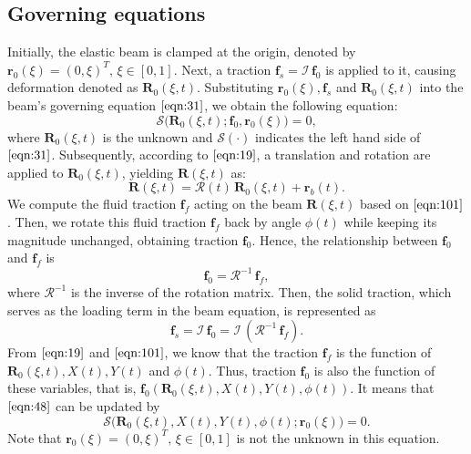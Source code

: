 \documentclass[lineno]{JFM-FLM_Au}
\begin{document}
\subsection{Governing equations}
Initially, the elastic beam is clamped at the origin, denoted by $\mathbf{r}_0(\xi)=(0,\xi)^T,\,\xi\in [0,1]$. Next, a traction $\mathbf{f}_s=\mathcal{I}\,\mathbf{f}_0$  is applied to it, causing deformation denoted as $\mathbf{R}_0(\xi,t)$. Substituting 
$\mathbf{r}_0(\xi), \mathbf{f}_s$ and $\mathbf{R}_0(\xi,t)$ into the beam's governing equation $\eqref{eqn:31}$, we obtain the following equation:
\begin{equation}
	\label{eqn:48}
	\mathbf{\mathcal{S}}\Big(\mathbf{R}_0(\xi,t);\mathbf{f}_0,\mathbf{r}_0(\xi)\Big)=0,
\end{equation}
where $\mathbf{R}_0(\xi,t)$ is the unknown and $\mathbf{\mathcal{S}}(\cdot)$ indicates the left hand side of $\eqref{eqn:31}$.
Subsequently, according to $\eqref{eqn:19}$, a translation and rotation are applied to 
$\mathbf{R}_0(\xi,t)$, yielding $\mathbf{R}(\xi,t)$ as:
\begin{equation}
	\label{eqn:49}
	\mathbf{R}(\xi,t)=\mathbf{\mathcal{R}}(t)\,\mathbf{R}_0(\xi,t)+\mathbf{r}_b(t).
\end{equation}
We compute the fluid traction $\mathbf{f}_f$ acting on the beam $\mathbf{R}(\xi,t)$ based on $\eqref{eqn:101}$. Then, we rotate this fluid traction $\mathbf{f}_f$ back by angle $\phi(t)$ while keeping its magnitude unchanged, obtaining traction $\mathbf{f}_0$. Hence, the relationship between $\mathbf{f}_0$ and $\mathbf{f}_f$ is 
\begin{equation}
	\label{eqn:50}
	\mathbf{f}_0=\mathbf{\mathcal{R}}^{-1}\,\mathbf{f}_f,
\end{equation}
where $\mathbf{\mathcal{R}}^{-1}$ is the inverse of the rotation matrix. Then, the solid traction, which serves as the loading term in the beam equation, is represented as 
\begin{equation}
	\label{eqn:67}
	\mathbf{f}_s=\mathcal{I}\,\mathbf{f}_0=\mathcal{I}\,\left(\mathbf{\mathcal{R}}^{-1}\,\mathbf{f}_f\right).
\end{equation}
From $\eqref{eqn:19}$ and $\eqref{eqn:101}$, we know that the traction $\textbf{f}_f$ is the function of $\textbf{R}_0(\xi,t), X(t), Y(t)$ and $\phi(t)$. Thus, traction $\textbf{f}_0$ is also the function of these variables, that is, $\textbf{f}_0\left(\textbf{R}_0(\xi,t), X(t), Y(t),\phi(t)\right)$. It means that $\eqref{eqn:48}$ can be updated by
\begin{equation}
	\label{eqn:51}
	\mathbf{\mathcal{S}}\Big(\mathbf{R}_0(\xi,t), X(t), Y(t),\phi(t);\mathbf{r}_0(\xi)\Big)=0.
\end{equation}
Note that $\mathbf{r}_0(\xi)=(0,\xi)^T,\,\xi\in [0,1]$ is not the unknown in this equation.
\end{document}
